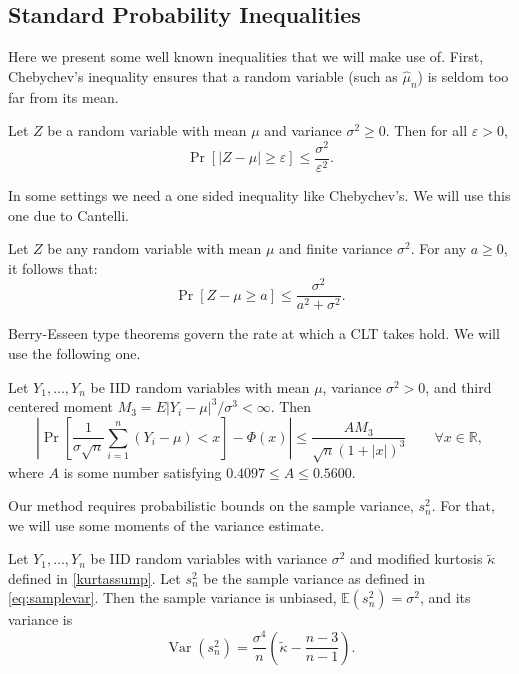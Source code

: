 \documentclass[graybox]{svmult}
\newcommand\reals{\mathbb{R}}
\newcommand\e{\mathbb{E}}
\newcommand{\Prob}{\Pr}
\newcommand{\abs}[1]{\left|#1\right|}
\DeclareMathOperator{\var}{Var}
\def\abs#1{\ensuremath{\left \lvert #1 \right \rvert}}
\begin{document}
\subsection{Standard Probability Inequalities}

Here we present some well known inequalities
that we will make use of.
First, Chebychev's inequality ensures that
a random variable (such as $\hat\mu_n$) is
seldom too far from its mean.

\begin{theorem} \citep[6.1c, p.\ 52]{LinBai10a}\label{Chebineqthm} Let $Z$ be a random variable with mean $\mu$ and variance $\sigma^2 \ge 0$.  
Then for all $\varepsilon >0$,
\[
\Prob[\abs{Z-\mu} \ge \varepsilon ] \le \frac{\sigma^2}{\varepsilon^2}.
\]
\end{theorem}


In some settings we need a one sided inequality
like Chebychev's. We will use this one due to Cantelli.

\begin{theorem} \citep[6.1e, p.\ 53]{LinBai10a} \label{Can}
Let $Z$ be any random variable with mean $\mu$ and finite variance $\sigma^2$.  For any $a\geq 0$, it
follows that:
\[
\Prob[Z-\mu \geq a]\leq \frac{\sigma^2}{a^2+\sigma^2}.
\]
\end{theorem}

Berry-Esseen type theorems govern the rate at which
a CLT takes hold. We will use the following one.

\begin{theorem} \cite[Theorem 5.16, p. 168]{Pet95a} \label{BE} Let $Y_1,\dots,Y_n$ be IID random variables with mean
$\mu$, variance $\sigma^2>0$, and third centered moment $M_3=E\abs{Y_i - \mu}^3/\sigma^3 < \infty$.
Then
\[
\abs{\Prob\left[\frac{1}{\sigma\sqrt{n}}\sum_{i=1}^{n}(Y_i-\mu)<x
\right]-\Phi(x)}\leq \frac{A M_3}{\sqrt{n}(1+\abs{x})^{3}} \qquad \forall x \in \reals,
\] 
where $A$ is some number satisfying $0.4097\leq A\leq 0.5600$.
\end{theorem}

Our method requires probabilistic bounds on the sample variance, $s_n^2$. For that,
we will use some moments of the variance estimate.

\begin{theorem} \cite[Eq.\ (7.16), p.\ 265]{Mil86} \label{Varvarthm} Let $Y_1, \ldots, Y_n$ be IID random variables with variance $\sigma^2$ and modified
kurtosis $\tilde \kappa$ defined in \eqref{kurtassump}.
Let  $s^2_n$ be the sample variance as defined in \eqref{eq:samplevar}.  Then the sample variance is unbiased, $\e(s^2_n)=\sigma^2$, and its variance is
\[
\var(s^2_n) = \frac{\sigma^4}{n} \left ( \tilde\kappa  - \frac{n-3}{n-1} \right).
\]
\end{theorem}
\end{document}
